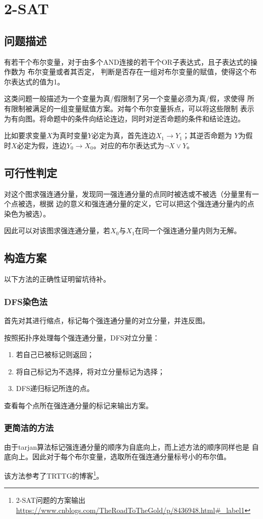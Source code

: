 \section{2-SAT}
\subsection{问题描述}
有若干个布尔变量，对于由多个AND连接的若干个OR子表达式，且子表达式的操作数为
布尔变量或者其否定，
判断是否存在一组对布尔变量的赋值，使得这个布尔表达式的值为1。

这类问题一般描述为一个变量为真/假限制了另一个变量必须为真/假，求使得
所有限制被满足的一组变量赋值方案。对每个布尔变量拆点，可以将这些限制
表示为有向图。将命题中的条件向结论连边，同时对逆否命题的条件和结论连边。

比如要求变量$X$为真时变量$Y$必定为真，首先连边$X_1\rightarrow Y_1$；其逆否命题为
$Y$为假时$X$必定为假，连边$Y_0\rightarrow X_0$。对应的布尔表达式为$\neg X \vee Y$。
\subsection{可行性判定}
对这个图求强连通分量，发现同一强连通分量的点同时被选或不被选（分量里有一个点被选，根据
边的意义和强连通分量的定义，它可以把这个强连通分量内的点染色为被选）。

因此可以对该图求强连通分量，若$X_0$与$X_1$在同一个强连通分量内则为无解。
\subsection{构造方案}
以下方法的正确性证明留坑待补。
\subsubsection{DFS染色法}
首先对其进行缩点，标记每个强连通分量的对立分量，并连反图。

按照拓扑序处理每个强连通分量，DFS对立分量：
\begin{enumerate}
    \item 若自己已被标记则返回；
    \item 将自己标记为不选择，将对立分量标记为选择；
    \item DFS递归标记所连的点。
\end{enumerate}
查看每个点所在强连通分量的标记来输出方案。
\subsubsection{更简洁的方法}
由于tarjan算法标记强连通分量的顺序为自底向上，而上述方法的顺序同样也是
自底向上。因此对于每个布尔变量，选取所在强连通分量标号小的布尔值。

该方法参考了TRTTG的博客\footnote{2-SAT问题的方案输出
\url{https://www.cnblogs.com/TheRoadToTheGold/p/8436948.html\#\_label1}}。
